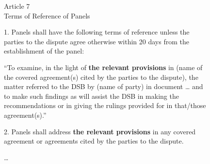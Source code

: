 \begin{figure}
  \begin{displayquote}[][]
    \begin{center}
      Article 7\\
      Terms of Reference of Panels
    \end{center}
  
    1. Panels shall have the following terms of reference unless the parties to the dispute
    agree otherwise within 20 days from the establishment of the panel:
  
    \begin{displayquote}[][]
  
      ``To examine, in the light of {\bf the relevant provisions} in (name of the covered
      agreement(s) cited by the parties to the dispute), the matter referred to the DSB by
      (name of party) in document … and to make such findings as will assist the DSB in
      making the recommendations or in giving the rulings provided for in that/those
      agreement(s).''
        
    \end{displayquote}
  
    2. Panels shall address {\bf the relevant provisions} in any covered agreement or agreements
    cited by the parties to the dispute.
  
    \ldots
  \end{displayquote}
\end{figure}

